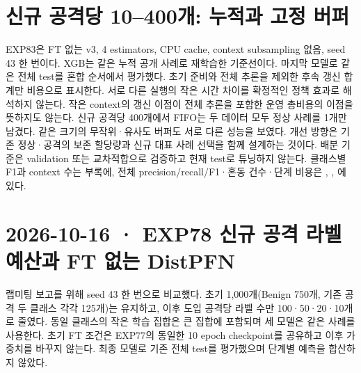 \section{신규 공격당 10--400개: 누적과 고정 버퍼}
EXP83은 FT 없는 v3, 4 estimators, CPU cache, context subsampling 없음, seed 43 한 번이다. XGB는 같은 누적 공개 사례로 재학습한 기준선이다. 마지막 모델로 같은 전체 test를 혼합 순서에서 평가했다. 초기 준비와 전체 추론을 제외한 후속 갱신 합계만 비용으로 표시한다.
서로 다른 실행의 작은 시간 차이를 확정적인 정책 효과로 해석하지 않는다. 작은 context의 갱신 이점이 전체 추론을 포함한 운영 총비용의 이점을 뜻하지도 않는다.
신규 공격당 400개에서 FIFO는 두 데이터 모두 정상 사례를 1개만 남겼다. 같은 크기의 무작위·유사도 버퍼도 서로 다른 성능을 보였다. 개선 방향은 기존 정상·공격의 보존 할당량과 신규 대표 사례 선택을 함께 설계하는 것이다. 배분 기준은 validation 또는 교차적합으로 검증하고 현재 test로 튜닝하지 않는다.
클래스별 F1과 context 수는 부록에, 전체 precision/recall/F1·혼동 건수·단계 비용은 , , 에 있다.


\section{2026-10-16 · EXP78 신규 공격 라벨 예산과 FT 없는 DistPFN}
\label{report:20261016_exp78_results}
랩미팅 보고를 위해 seed 43 한 번으로 비교했다. 초기 1,000개(Benign 750개, 기존 공격 두 클래스 각각 125개)는 유지하고, 이후 도입 공격당 라벨 수만 100·50·20·10개로 줄였다. 동일 클래스의 작은 학습 집합은 큰 집합에 포함되며 세 모델은 같은 사례를 사용한다. 초기 FT 조건은 EXP77의 동일한 10 epoch checkpoint를 공유하고 이후 가중치를 바꾸지 않는다. 최종 모델로 기존 전체 test를 평가했으며 단계별 예측을 합산하지 않았다.


